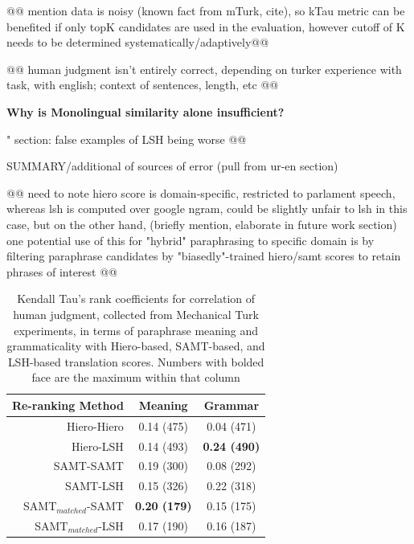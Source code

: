 \documentclass[11pt]{article}
\begin{document}
@@ mention data is noisy (known fact from mTurk, cite), so kTau metric can be benefited if only topK candidates are used in the evaluation, however cutoff of K needs to be determined systematically/adaptively@@

@@ human judgment isn't entirely correct, depending on turker experience with task, with english; context of sentences, length, etc @@

{\bf Why is Monolingual similarity alone insufficient?}

" section: false examples of LSH being worse @@

SUMMARY/additional of sources of error (pull from ur-en section)

@@ need to note hiero score is domain-specific, restricted to parlament speech, whereas lsh is computed over google ngram, could be slightly unfair to lsh in this case, but on the other hand, (briefly mention, elaborate in future work section) one potential use of this for "hybrid" paraphrasing to specific domain is by filtering paraphrase candidates by "biasedly"-trained hiero/samt scores to retain phrases of interest @@


\begin{table}%
\begin{center}
\begin{tabular}{rcc}%
\hline\hline \bf \footnotesize Re-ranking Method & \bf \footnotesize Meaning & \bf \footnotesize Grammar \\ \hline
{\scriptsize Hiero-Hiero} & {\scriptsize 0.14 (475)} & {\scriptsize 0.04 (471)} \\
{\scriptsize Hiero-LSH} & {\scriptsize 0.14 (493)} & {\scriptsize \bf 0.24 (490)} \\
{\scriptsize SAMT-SAMT}& {\scriptsize 0.19 (300)}& {\scriptsize 0.08 (292)} \\
{\scriptsize SAMT-LSH} & {\scriptsize 0.15 (326)} & {\scriptsize 0.22 (318)} \\
\hline 
{\scriptsize SAMT$_{matched}$-SAMT} &  {\scriptsize \bf 0.20 (179)} & {\scriptsize 0.15 (175)} \\
{\scriptsize SAMT$_{matched}$-LSH}&  {\scriptsize 0.17 (190)} & {\scriptsize 0.16 (187)} \\
\hline
\end{tabular}
\end{center}
\caption{\label{table4} Kendall Tau's rank coefficients for correlation of human judgment, collected from Mechanical Turk experiments, in terms of paraphrase meaning and grammaticality with Hiero-based, SAMT-based, and LSH-based translation scores. Numbers with bolded face are the maximum within that column}
\end{table}
\end{document}
